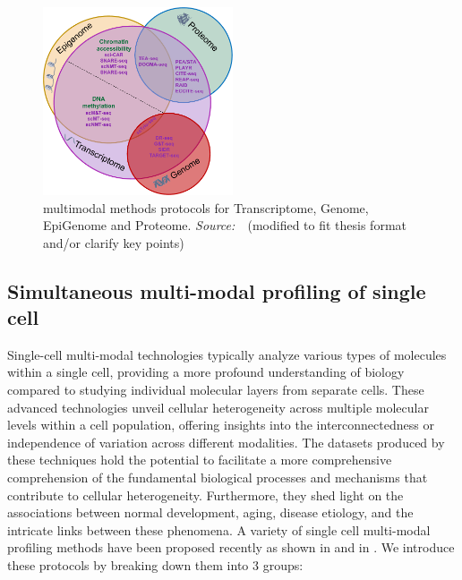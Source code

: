 \begin{figure}[!ht]
	\centering
	\includegraphics[width=0.50\textwidth]{multi-model-methods/fig}
	\vspace{0.1cm}
	\caption[multimodal methods protocols for Transcriptome, Genome, EpiGenome and Proteome]{multimodal methods protocols for Transcriptome, Genome, EpiGenome and Proteome. \emph{Source:~\cite{lee2020single}}~(modified to fit thesis format and/or clarify key points)}
	\label{fig:piechart-mulitmodal-methods}
\end{figure}



\subsection{Simultaneous multi-modal profiling of single cell}
\label{background:sec1:mulitmodal}
Single-cell multi-modal technologies typically analyze various types of molecules within a single cell, providing a more profound understanding of biology compared to studying individual molecular layers from separate cells. These advanced technologies unveil cellular heterogeneity across multiple molecular levels within a cell population, offering insights into the interconnectedness or independence of variation across different modalities. The datasets produced by these techniques hold the potential to facilitate a more comprehensive comprehension of the fundamental biological processes and mechanisms that contribute to cellular heterogeneity. Furthermore, they shed light on the associations between normal development, aging, disease etiology, and the intricate links between these phenomena. A variety of single cell multi-modal profiling methods have been proposed recently as shown in  and in . We introduce these protocols by breaking down them into 3 groups:

